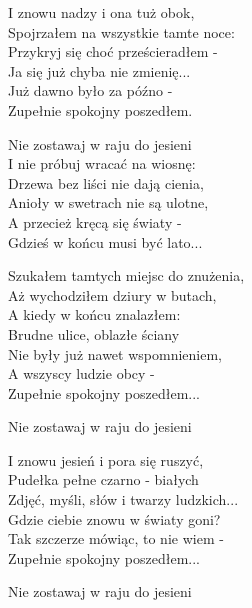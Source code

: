 \begin{text}
    I znowu nadzy i ona tuż obok,\\
    Spojrzałem na wszystkie tamte noce:\\
    Przykryj się choć prześcieradłem -\\
    Ja się już chyba nie zmienię...\\
    Już dawno było za późno -\\
    Zupełnie spokojny poszedłem.

    \vin Nie zostawaj w raju do jesieni\\
    \vin I nie próbuj wracać na wiosnę:\\
    \vin Drzewa bez liści nie dają cienia,\\
    \vin Anioły w swetrach nie są ulotne,\\
    \vin A przecież kręcą się światy -\\
    \vin Gdzieś w końcu musi być lato...

    Szukałem tamtych miejsc do znużenia,\\
    Aż wychodziłem dziury w butach,\\
    A kiedy w końcu znalazłem:\\
    Brudne ulice, oblazłe ściany\\
    Nie były już nawet wspomnieniem,\\
    A wszyscy ludzie obcy -\\
    Zupełnie spokojny poszedłem...

    \vin Nie zostawaj w raju do jesieni

    I znowu jesień i pora się ruszyć,\\
    Pudełka pełne czarno - białych\\
    Zdjęć, myśli, słów i twarzy ludzkich...\\
    Gdzie ciebie znowu w światy goni?\\
    Tak szczerze mówiąc, to nie wiem -\\
    Zupełnie spokojny poszedłem...

    \vin Nie zostawaj w raju do jesieni
\end{text}
